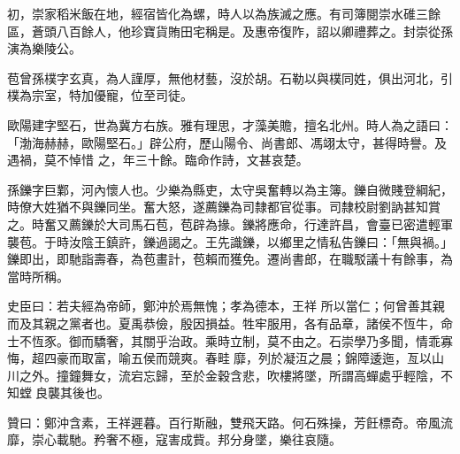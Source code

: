 \begin{pinyinscope}
 初，崇家稻米飯在地，經宿皆化為螺，時人以為族滅之應。有司簿閱崇水碓三餘區，蒼頭八百餘人，他珍寶貨賄田宅稱是。及惠帝復阼，詔以卿禮葬之。封崇從孫演為樂陵公。



 苞曾孫樸字玄真，為人謹厚，無他材藝，沒於胡。石勒以與樸同姓，俱出河北，引樸為宗室，特加優寵，位至司徒。



 歐陽建字堅石，世為冀方右族。雅有理思，才藻美贍，擅名北州。時人為之語曰：「渤海赫赫，歐陽堅石。」辟公府，歷山陽令、尚書郎、馮翊太守，甚得時譽。及遇禍，莫不悼惜
 之，年三十餘。臨命作詩，文甚哀楚。



 孫鑠字巨鄴，河內懷人也。少樂為縣吏，太守吳奮轉以為主簿。鑠自微賤登綱紀，時僚大姓猶不與鑠同坐。奮大怒，遂薦鑠為司隸都官從事。司隸校尉劉訥甚知賞之。時奮又薦鑠於大司馬石苞，苞辟為掾。鑠將應命，行達許昌，會臺已密遣輕軍襲苞。于時汝陰王鎮許，鑠過謁之。王先識鑠，以鄉里之情私告鑠曰：「無與禍。」鑠即出，即馳詣壽春，為苞畫計，苞賴而獲免。遷尚書郎，在職駁議十有餘事，為當時所稱。



 史臣曰：若夫經為帝師，鄭沖於焉無愧；孝為德本，王祥
 所以當仁；何曾善其親而及其親之黨者也。夏禹恭儉，殷因損益。牲牢服用，各有品章，諸侯不恆牛，命士不恆豕。御而驕奢，其關乎治政。乘時立制，莫不由之。石崇學乃多聞，情乖寡悔，超四豪而取富，喻五侯而競爽。春畦𧆑靡，列於凝沍之晨；錦障逶迤，亙以山川之外。撞鐘舞女，流宕忘歸，至於金穀含悲，吹樓將墜，所謂高蟬處乎輕陰，不知螳良襲其後也。



 贊曰：鄭沖含素，王祥遲暮。百行斯融，雙飛天路。何石殊操，芳飪標奇。帝風流靡，崇心載馳。矜奢不極，寇害成貲。邦分身墜，樂往哀隨。



\end{pinyinscope}